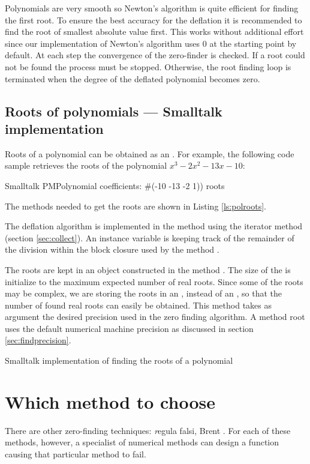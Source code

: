 Polynomials are very smooth so Newton's algorithm is quite
efficient for finding the first root. To ensure the best accuracy
for the deflation it is recommended to find the root of smallest
absolute value first. This works without additional effort since
our implementation of Newton's algorithm uses 0 at the starting
point by default. At each step the convergence of the zero-finder
is checked. If a root could not be found the process must be
stopped. Otherwise, the root finding loop is terminated when the
degree of the deflated polynomial becomes zero.

\subsection{Roots of polynomials --- Smalltalk implementation}
Roots of a polynomial can be obtained as an . For example, the following code sample retrieves the roots of the polynomial $x^3-2x^2-13x-10$:
\begin{displaycode}{Smalltalk}
PMPolynomial coefficients: \#(-10 -13 -2 1)) roots
\end{displaycode}
The methods needed to get the roots are shown in Listing
\ref{ls:polroots}.

The deflation algorithm is implemented in the method  using the iterator method  (\cf section
\ref{sec:collect}). An instance variable is keeping track of the
remainder of the division within the block closure used by the
method .

The roots are kept in an  object
constructed in the method . The size of the  is initialize to the maximum expected number of
real roots. Since some of the roots may be complex, we are storing
the roots in an , instead of an , so that the number of found real roots can easily be
obtained. This method takes as argument the desired precision used
in the zero finding algorithm. A method root uses the default
numerical machine precision as discussed in section
\ref{sec:findprecision}.

\begin{listing} Smalltalk implementation of finding the roots of a polynomial \label{ls:polroots}

\end{listing}

\section{Which method to choose}
There are other zero-finding techniques: {\textit regula falsi}, Brent
\cite{Press}. For each of these methods, however, a specialist of
numerical methods can design a function causing that particular
method to fail.

